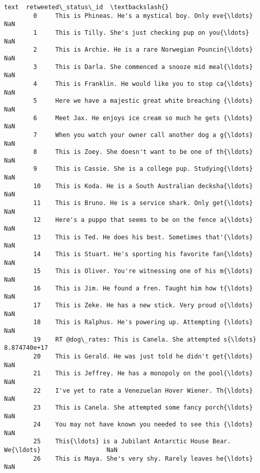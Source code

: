 \documentclass[11pt]{article}
\begin{document}
\begin{Verbatim}[commandchars=\\\{\}]
                                                           text  retweeted\_status\_id  \textbackslash{}
        0     This is Phineas. He's a mystical boy. Only eve{\ldots}                  NaN   
        1     This is Tilly. She's just checking pup on you{\ldots}                  NaN   
        2     This is Archie. He is a rare Norwegian Pouncin{\ldots}                  NaN   
        3     This is Darla. She commenced a snooze mid meal{\ldots}                  NaN   
        4     This is Franklin. He would like you to stop ca{\ldots}                  NaN   
        5     Here we have a majestic great white breaching {\ldots}                  NaN   
        6     Meet Jax. He enjoys ice cream so much he gets {\ldots}                  NaN   
        7     When you watch your owner call another dog a g{\ldots}                  NaN   
        8     This is Zoey. She doesn't want to be one of th{\ldots}                  NaN   
        9     This is Cassie. She is a college pup. Studying{\ldots}                  NaN   
        10    This is Koda. He is a South Australian decksha{\ldots}                  NaN   
        11    This is Bruno. He is a service shark. Only get{\ldots}                  NaN   
        12    Here's a puppo that seems to be on the fence a{\ldots}                  NaN   
        13    This is Ted. He does his best. Sometimes that'{\ldots}                  NaN   
        14    This is Stuart. He's sporting his favorite fan{\ldots}                  NaN   
        15    This is Oliver. You're witnessing one of his m{\ldots}                  NaN   
        16    This is Jim. He found a fren. Taught him how t{\ldots}                  NaN   
        17    This is Zeke. He has a new stick. Very proud o{\ldots}                  NaN   
        18    This is Ralphus. He's powering up. Attempting {\ldots}                  NaN   
        19    RT @dog\_rates: This is Canela. She attempted s{\ldots}         8.874740e+17   
        20    This is Gerald. He was just told he didn't get{\ldots}                  NaN   
        21    This is Jeffrey. He has a monopoly on the pool{\ldots}                  NaN   
        22    I've yet to rate a Venezuelan Hover Wiener. Th{\ldots}                  NaN   
        23    This is Canela. She attempted some fancy porch{\ldots}                  NaN   
        24    You may not have known you needed to see this {\ldots}                  NaN   
        25    This{\ldots} is a Jubilant Antarctic House Bear. We{\ldots}                  NaN   
        26    This is Maya. She's very shy. Rarely leaves he{\ldots}                  NaN   

\end{Verbatim}
\end{document}
